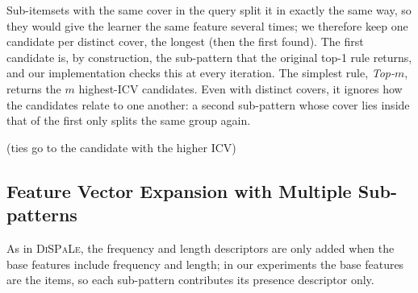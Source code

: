 Sub-itemsets with the same cover in the query split it in exactly the same way, so they would give the learner
the same feature several times; we therefore keep one candidate per distinct cover, the longest (then the first
found). The first candidate is, by construction, the sub-pattern that the original top-1 rule returns, and our
implementation checks this at every iteration. The simplest rule, \emph{Top-$m$}, returns the $m$
highest-ICV candidates. Even with distinct covers, it ignores how the candidates relate to one another: a
second sub-pattern whose cover lies inside that of the first only splits the same group again.

(ties go to the candidate with the higher ICV)


\subsection{Feature Vector Expansion with Multiple Sub-patterns}
As in \textsc{DiSPaLe}, the frequency and length descriptors are only added when the base features include
frequency and length; in our experiments the base features are the items, so each sub-pattern contributes its
presence descriptor only.


